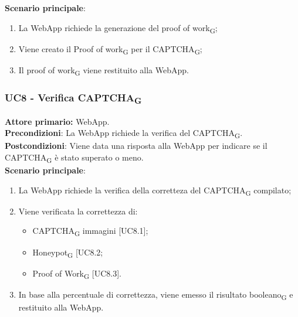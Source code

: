 \textbf{Scenario principale}:
\begin{enumerate}
    \item La WebApp richiede la generazione del proof of work\textsubscript{G};
    \item Viene creato il Proof of work\textsubscript{G} per il CAPTCHA\textsubscript{G};
    \item Il proof of work\textsubscript{G} viene restituito alla WebApp.
\end{enumerate}

\subsubsection{UC8 - Verifica CAPTCHA\textsubscript{G}}
\textbf{Attore primario:} WebApp.\\
\textbf{Precondizioni}: La WebApp richiede la verifica 
 del CAPTCHA\textsubscript{G}.\\
\textbf{Postcondizioni}: Viene data una risposta alla WebApp per indicare se il CAPTCHA\textsubscript{G} è stato superato o meno.\\

\textbf{Scenario principale}:
\begin{enumerate}
    \item La WebApp richiede la verifica della corretteza del CAPTCHA\textsubscript{G} compilato;
    \item Viene verificata la correttezza di:
    \begin{itemize}
		\item CAPTCHA\textsubscript{G} immagini [UC8.1];
		\item Honeypot\textsubscript{G} [UC8.2;
		\item Proof of Work\textsubscript{G} [UC8.3].
    \end{itemize}
    \item In base alla percentuale di correttezza, viene emesso il risultato booleano\textsubscript{G} e restituito alla WebApp.
\end{enumerate}

